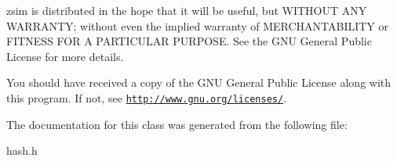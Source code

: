 zsim is distributed in the hope that it will be useful, but W\-I\-T\-H\-O\-U\-T A\-N\-Y W\-A\-R\-R\-A\-N\-T\-Y; without even the implied warranty of M\-E\-R\-C\-H\-A\-N\-T\-A\-B\-I\-L\-I\-T\-Y or F\-I\-T\-N\-E\-S\-S F\-O\-R A P\-A\-R\-T\-I\-C\-U\-L\-A\-R P\-U\-R\-P\-O\-S\-E. See the G\-N\-U General Public License for more details.

You should have received a copy of the G\-N\-U General Public License along with this program. If not, see \href{http://www.gnu.org/licenses/}{\tt http\-://www.\-gnu.\-org/licenses/}. 

The documentation for this class was generated from the following file\-:\begin{DoxyCompactItemize}
\item 
hash.\-h\end{DoxyCompactItemize}
